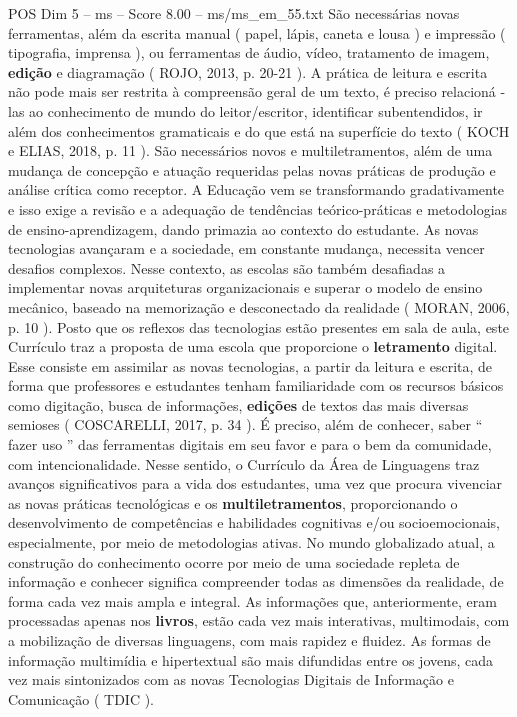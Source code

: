 \begin{textsample}{POS Dim 5 – ms – Score 8.00 – ms/ms\_em\_55.txt}
São necessárias novas ferramentas, além da escrita manual ( papel, lápis, caneta e lousa ) e impressão ( tipografia, imprensa ), ou ferramentas de áudio, vídeo, tratamento de imagem, \textbf{edição} e diagramação ( ROJO, 2013, p. 20-21 ).
A prática de leitura e escrita não pode mais ser restrita à compreensão geral de um texto, é preciso relacioná -las ao conhecimento de mundo do leitor/escritor, identificar subentendidos, ir além dos conhecimentos gramaticais e do que está na superfície do texto ( KOCH e ELIAS, 2018, p. 11 ).
São necessários novos e multiletramentos, além de uma mudança de concepção e atuação requeridas pelas novas práticas de produção e análise crítica como receptor.
A Educação vem se transformando gradativamente e isso exige a revisão e a adequação de tendências teórico-práticas e metodologias de ensino-aprendizagem, dando primazia ao contexto do estudante.
As novas tecnologias avançaram e a sociedade, em constante mudança, necessita vencer desafios complexos.
Nesse contexto, as escolas são também desafiadas a implementar novas arquiteturas organizacionais e superar o modelo de ensino mecânico, baseado na memorização e desconectado da realidade ( MORAN, 2006, p. 10 ).
Posto que os reflexos das tecnologias estão presentes em sala de aula, este Currículo traz a proposta de uma escola que proporcione o \textbf{letramento} digital.
Esse consiste em assimilar as novas tecnologias, a partir da leitura e escrita, de forma que professores e estudantes tenham familiaridade com os recursos básicos como digitação, busca de informações, \textbf{edições} de textos das mais diversas semioses ( COSCARELLI, 2017, p. 34 ).
É preciso, além de conhecer, saber “ fazer uso ” das ferramentas digitais em seu favor e para o bem da comunidade, com intencionalidade.
Nesse sentido, o Currículo da Área de Linguagens traz avanços significativos para a vida dos estudantes, uma vez que procura vivenciar as novas práticas tecnológicas e os \textbf{multiletramentos}, proporcionando o desenvolvimento de competências e habilidades cognitivas e/ou socioemocionais, especialmente, por meio de metodologias ativas.
No mundo globalizado atual, a construção do conhecimento ocorre por meio de uma sociedade repleta de informação e conhecer significa compreender todas as dimensões da realidade, de forma cada vez mais ampla e integral.
As informações que, anteriormente, eram processadas apenas nos \textbf{livros}, estão cada vez mais interativas, multimodais, com a mobilização de diversas linguagens, com mais rapidez e fluidez.
As formas de informação multimídia e hipertextual são mais difundidas entre os jovens, cada vez mais sintonizados com as novas Tecnologias Digitais de Informação e Comunicação ( TDIC ).

\end{textsample}
